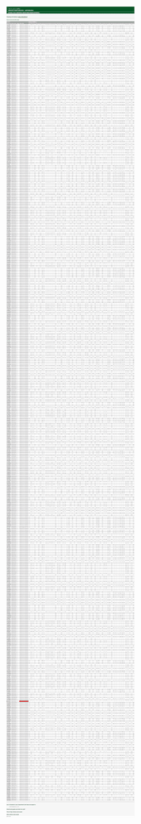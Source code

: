\begin{figure}
  \begin{minipage}[]{0.33\linewidth}
    \centering
    \includegraphics[width=0.6\linewidth]{images/walkthrough/admin_view_all_choices.png}

\end{minipage}
\end{figure}
